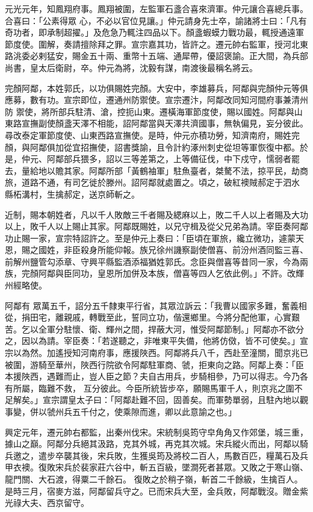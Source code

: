 \begin{pinyinscope}
 元光元年，知鳳翔府事。鳳翔被圍，左監軍石盞合喜來濟軍。仲元讓合喜總兵事。合喜曰：「公素得眾
 心，不必以官位見讓。」仲元請身先士卒，諭諸將士曰：「凡有奇功者，即承制超擢。」及危急乃輒注四品以下。顏盞蝦蟆力戰功最，輒授通遠軍節度使。圍解，奏請擅除拜之罪。宣宗嘉其功，皆許之。遷元帥右監軍，授河北東路洮委必剌猛安，賜金五十兩、重幣十五端、通犀帶，優詔褒諭。正大間，為兵部尚書，皇太后衛尉，卒。仲元為將，沈毅有謀，南渡後最稱名將云。



 完顏阿鄰，本姓郭氏，以功俱賜姓完顏。大安中，李雄募兵，阿鄰與完顏仲元等俱應募，數有功。宣宗即位，遷通州防禦使。宣宗遷汴，阿鄰改同知河間府事兼清州防
 禦使，將所部兵駐清、滄，控扼山東。遷橫海軍節度使，賜以國姓。阿鄰與山東路宣撫副使顏盞天澤不相能，詔阿鄰當與天澤共濟國事，無執偏見，妄分彼此。尋改泰定軍節度使、山東西路宣撫使。是時，仲元亦積功勞，知濟南府，賜姓完顏，與阿鄰俱加從宜招撫使，詔書獎諭，且令計約涿州刺史從坦等軍恢復中都。於是，仲元、阿鄰部兵猥多，詔以三等差第之，上等備征伐，中下戍守，懦弱者罷去，量給地以贍其家。阿鄰所部「黃鶴袖軍」駐魚臺者，桀驁不法，掠平民，劫商旅，道路不通，有司乞徙於滕州。詔阿鄰就處置之。頃之，破紅襖賊郝定于泗水
 縣柘溝村，生擒郝定，送京師斬之。



 近制，賜本朝姓者，凡以千人敗敵三千者賜及緦麻以上，敗二千人以上者賜及大功以上，敗千人以上賜止其家。阿鄰既賜姓，以兄守楫及從父兄弟為請。宰臣奏阿鄰功止賜一家，宣宗特詔許之。至是仲元上奏曰：「臣頃在軍旅，纔立微功，遽蒙天恩，賜之國姓，非臣殺身所能仰報。族兄徐州譏察副使僧喜、前汾州酒同監三喜、前解州鹽管勾添章、守興平縣監酒添福猶姓郭氏。念臣與僧喜等昔同一家，今為兩族，完顏阿鄰與臣同功，皇恩所加併及本族，僧喜等四人乞依此例。」不許。改輝州經略使。



 阿鄰有
 眾萬五千，詔分五千隸東平行省，其眾泣訴云：「我曹以國家多難，奮義相從，捐田宅，離親戚，轉戰至此，誓同立功，偕還鄉里。今將分配他軍，心實艱苦。乞以全軍分駐懷、衛、輝州之間，捍蔽大河，惟受阿鄰節制。」阿鄰亦不欲分之，因以為請。宰臣奏：「若遂聽之，非唯東平失備，他將仿傚，皆不可使矣。」宣宗以為然。加遙授知河南府事，應援陜西。阿鄰將兵八千，西赴至潼關，聞京兆已被圍，游騎至華州，陜西行院欲令阿鄰駐軍商、虢，拒東向之路。阿鄰上奏：「臣本援陜西，遇難而止，豈人臣之節？夫自古用兵，步騎相參，乃可以得志。今乃各有所屬，臨難不救，
 互分彼此。今臣所統皆步卒，願賜馬軍千人，則京兆之圍不足解矣。」宣宗謂皇太子曰：「阿鄰赴難不回，固善矣。而軍勢單弱，且駐內地以觀事變，併以虢州兵五千付之，使乘隙而進，卿以此意諭之也。」



 興定元年，遷元帥右都監，出秦州伐宋。宋統制吳筠守皁角角又作郊堡，城三重，據山之巔。阿鄰分兵絕其汲路，克其外城，再克其次城。宋兵縱火而出，阿鄰以騎兵邀之，遣步卒襲其後，宋兵敗，生獲吳筠及將校二百人，馬數百匹，糧萬石及兵甲衣襖。復敗宋兵於裴家莊六谷中，斬五百級，墜澗死者甚眾。又敗之于寒山嶺、龍門關、大石渡，得粟二千餘石。
 復敗之於稍子嶺，斬首二千餘級，生擒百人。是時三月，宿麥方滋，阿鄰留兵守之。已而宋兵大至，金兵敗，阿鄰戰沒。贈金紫光祿大夫、西京留守。




\end{pinyinscope}
